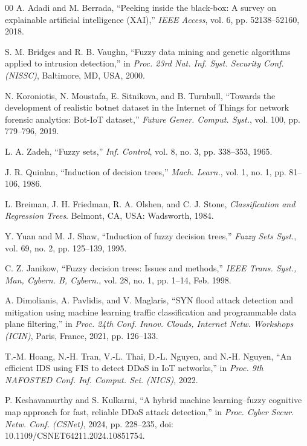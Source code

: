 \documentclass[conference]{IEEEtran}
\begin{document}
\begin{thebibliography}{00}
 A. Adadi and M. Berrada, ``Peeking inside the black-box: A survey on explainable artificial intelligence (XAI),'' \emph{IEEE Access}, vol. 6, pp. 52138--52160, 2018.

 S. M. Bridges and R. B. Vaughn, ``Fuzzy data mining and genetic algorithms applied to intrusion detection,'' in \emph{Proc. 23rd Nat. Inf. Syst. Security Conf. (NISSC)}, Baltimore, MD, USA, 2000.

 N. Koroniotis, N. Moustafa, E. Sitnikova, and B. Turnbull, ``Towards the development of realistic botnet dataset in the Internet of Things for network forensic analytics: Bot-IoT dataset,'' \emph{Future Gener. Comput. Syst.}, vol. 100, pp. 779--796, 2019.

 L. A. Zadeh, ``Fuzzy sets,'' \emph{Inf. Control}, vol. 8, no. 3, pp. 338--353, 1965.

 J. R. Quinlan, ``Induction of decision trees,'' \emph{Mach. Learn.}, vol. 1, no. 1, pp. 81--106, 1986.

 L. Breiman, J. H. Friedman, R. A. Olshen, and C. J. Stone, \emph{Classification and Regression Trees}. Belmont, CA, USA: Wadsworth, 1984.

 Y. Yuan and M. J. Shaw, ``Induction of fuzzy decision trees,'' \emph{Fuzzy Sets Syst.}, vol. 69, no. 2, pp. 125--139, 1995.

 C. Z. Janikow, ``Fuzzy decision trees: Issues and methods,'' \emph{IEEE Trans. Syst., Man, Cybern. B, Cybern.}, vol. 28, no. 1, pp. 1--14, Feb. 1998.

 A. Dimolianis, A. Pavlidis, and V. Maglaris, ``SYN flood attack detection and mitigation using machine learning traffic classification and programmable data plane filtering,'' in \emph{Proc. 24th Conf. Innov. Clouds, Internet Netw. Workshops (ICIN)}, Paris, France, 2021, pp. 126--133.

 T.-M. Hoang, N.-H. Tran, V.-L. Thai, D.-L. Nguyen, and N.-H. Nguyen, ``An efficient IDS using FIS to detect DDoS in IoT networks,'' in \emph{Proc. 9th NAFOSTED Conf. Inf. Comput. Sci. (NICS)}, 2022.

 P. Keshavamurthy and S. Kulkarni, ``A hybrid machine learning--fuzzy cognitive map approach for fast, reliable DDoS attack detection,'' in \emph{Proc. Cyber Secur. Netw. Conf. (CSNet)}, 2024, pp. 228--235, doi: 10.1109/CSNET64211.2024.10851754.


\end{thebibliography}
\end{document}
